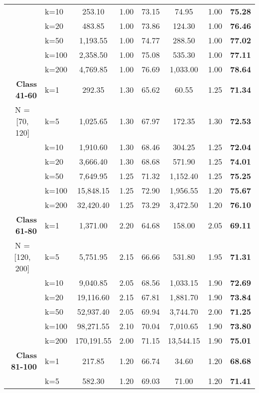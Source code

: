 \begin{table}[htbp]
\begin{tabular}{|l|l|c|c|c|c|c|c|}
     & k=10 & 253.10 & 1.00 & 73.15 & 74.95 & 1.00 & \textbf{75.28} \\ 
     & k=20 & 483.85 & 1.00 & 73.86 & 124.30 & 1.00 & \textbf{76.46} \\ 
     & k=50 & 1,193.55 & 1.00 & 74.77 & 288.50 & 1.00 & \textbf{77.02} \\ 
     & k=100 & 2,358.50 & 1.00 & 75.08 & 535.30 & 1.00 & \textbf{77.11} \\ 
     & k=200 & 4,769.85 & 1.00 & 76.69 & 1,033.00 & 1.00 & \textbf{78.64} \\ \hline
    \multicolumn{1}{|r|}{\textbf{Class 41-60}} & k=1 & 292.35 & 1.30 & 65.62 & 60.55 & 1.25 & \textbf{71.34} \\ 
    \multicolumn{1}{|c|}{N = [70, 120]} & k=5 & 1,025.65 & 1.30 & 67.97 & 172.35 & 1.30 & \textbf{72.53} \\ 
     & k=10 & 1,910.60 & 1.30 & 68.46 & 304.25 & 1.25 & \textbf{72.04} \\ 
     & k=20 & 3,666.40 & 1.30 & 68.68 & 571.90 & 1.25 & \textbf{74.01} \\ 
     & k=50 & 7,649.95 & 1.25 & 71.32 & 1,152.40 & 1.25 & \textbf{75.25} \\ 
     & k=100 & 15,848.15 & 1.25 & 72.90 & 1,956.55 & 1.20 & \textbf{75.67} \\ 
     & k=200 & 32,420.40 & 1.25 & 73.29 & 3,472.50 & 1.20 & \textbf{76.10} \\ \hline
    \multicolumn{1}{|r|}{\textbf{Class 61-80}} & k=1 & 1,371.00 & 2.20 & 64.68 & 158.00 & 2.05 & \textbf{69.11} \\ 
    \multicolumn{1}{|c|}{N = [120, 200]} & k=5 & 5,751.95 & 2.15 & 66.66 & 531.80 & 1.95 & \textbf{71.31} \\ 
     & k=10 & 9,040.85 & 2.05 & 68.56 & 1,033.15 & 1.90 & \textbf{72.69} \\ 
     & k=20 & 19,116.60 & 2.15 & 67.81 & 1,881.70 & 1.90 & \textbf{73.84} \\ 
     & k=50 & 52,937.40 & 2.05 & 69.94 & 3,744.70 & 2.00 & \textbf{71.25} \\ 
     & k=100 & 98,271.55 & 2.10 & 70.04 & 7,010.65 & 1.90 & \textbf{73.80} \\ 
     & k=200 & 170,191.55 & 2.00 & 71.15 & 13,544.15 & 1.90 & \textbf{75.01} \\ \hline
    \multicolumn{1}{|r|}{\textbf{Class 81-100}} & k=1 & 217.85 & 1.20 & 66.74 & 34.60 & 1.20 & \textbf{68.68} \\ 
     & k=5 & 582.30 & 1.20 & 69.03 & 71.00 & 1.20 & \textbf{71.41} \\ 

\end{tabular}
\end{table}
